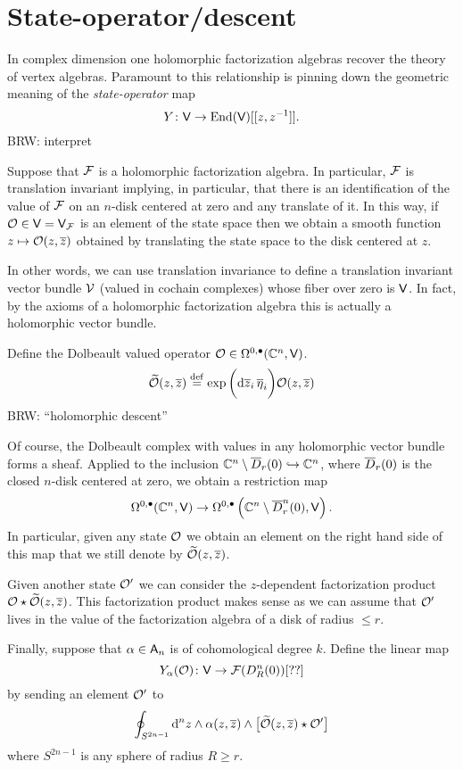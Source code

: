 \documentclass[11pt]{amsart}
\def\brian#1{{\textcolor{blue!65!red}{BRW: {#1}}}}
\begin{document}
\section{State-operator/descent}

In complex dimension one holomorphic factorization algebras recover the theory of vertex algebras. 
Paramount to this relationship is pinning down the geometric meaning of the {\em state-operator} map
\[
Y \colon \sfV \to {\rm End}(\sfV)[[z,z^{-1}]] .
\]
\brian{interpret}

Suppose that $\cF$ is a holomorphic factorization algebra. 
In particular, $\cF$ is translation invariant implying, in particular, that there is an identification of the value of $\cF$ on an $n$-disk centered at zero and any translate of it.
In this way, if $\cO \in \sfV = \sfV_{\cF}$ is an element of the state space then we obtain a smooth function $z \mapsto \cO(z,\zbar)$ obtained by translating the state space to the disk centered at $z$.

In other words, we can use translation invariance to define a translation invariant vector bundle $\cV$ (valued in cochain complexes) whose fiber over zero is $\sfV$. 
In fact, by the axioms of a holomorphic factorization algebra this is actually a holomorphic vector bundle. 

Define the Dolbeault valued operator $\cO \in \Omega^{0,\bu}(\CC^n, \sfV)$. 
\[
\Tilde{\cO} (z,\zbar) \define \exp \bigg( \d \zbar_i \, \Bar{\eta}_i \bigg) \cO(z, \zbar) 
\]
\brian{``holomorphic descent''}

Of course, the Dolbeault complex with values in any holomorphic vector bundle forms a sheaf. 
Applied to the inclusion $\CC^n \setminus \Bar{D}_r(0) \hookrightarrow \CC^n$, where $\Bar{D}_r(0)$ is the closed $n$-disk centered at zero, we obtain a restriction map 
\[
\Omega^{0,\bu}(\CC^n, \sfV) \to \Omega^{0,\bu}\left(\CC^n \setminus \Bar{D}^n_r(0), \sfV\right) .
\]
In particular, given any state $\cO$ we obtain an element on the right hand side of this map that we still denote by $\Tilde{\cO}(z, \zbar)$. 

Given another state $\cO'$ we can consider the $z$-dependent factorization product $\cO \star \Tilde{\cO}(z,\zbar)$. 
This factorization product makes sense as we can assume that $\cO'$ lives in the value of the factorization algebra of a disk of radius $\leq r$. 

Finally, suppose that $\alpha \in \sfA_n$ is of cohomological degree $k$. 
Define the linear map
\[
Y_\alpha (\cO) \colon \sfV \to \cF(D^n_R(0))[??]
\]
by sending an element $\cO'$ to 
\[
\oint_{S^{2n-1}} \d^n z \wedge \alpha (z,\zbar) \wedge \big[\Tilde{\cO}(z,\zbar) \star \cO'\big]  
\]
where $S^{2n-1}$ is any sphere of radius $R \geq r$. 
\end{document}
